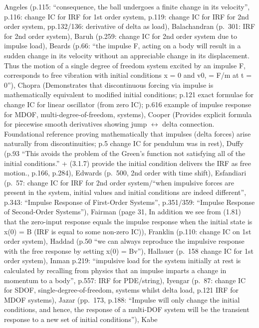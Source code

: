 \documentclass[
  11pt,
]{article}
\begin{document}
Angeles (p.115: ``consequence, the ball undergoes a finite change in its
velocity'', p.116: change IC for IRF for 1st order system, p.119: change
IC for IRF for 2nd order system, pp.132/136: derivative of delta as
load), Balachandran (p.~301: IRF for 2nd order system), Baruh (p.259:
change IC for 2nd order system due to impulse load), Beards (p.66: ``the
impulse F, acting on a body will result in a sudden change in its
velocity without an appreciable change in its displacement. Thus the
motion of a single degree of freedom system excited by an impulse F,
corresponds to free vibration with initial conditions x = 0 and v0, =
F/m at t = 0''), Chopra (Demonstrates that discontinuous forcing via
impulse is mathematically equivalent to modified initial conditions;
p.121 exact formulae for change IC for linear oscillator (from zero IC);
p.616 example of impulse response for MDOF, multi-degree-of-freedom,
systems), Cooper (Provides explicit formula for piecewise smooth
derivatives showing jump \(\leftrightarrow\) delta connection.
Foundational reference proving mathematically that impulses (delta
forces) arise naturally from discontinuities; p.5 change IC for pendulum
was in rest), Duffy (p.93 ``This avoids the problem of the Green's
function not satisfying all of the initial conditions.'' + (3.1.7)
provide the initial condition delivers the IRF as free motion., p.166,
p.284), Edwards (p.~500, 2nd order with time shift), Esfandiari (p.~57:
change IC for IRF for 2nd order system/``when impulsive forces are
present in the system, initial values and initial conditions are indeed
different'', p.343: ``Impulse Response of First-Order Systems'',
p.351/359: ``Impulse Response of Second-Order Systems''), Fairman (page
31, In addition we see from (1.81) that the zero-input response equals
the impulse response when the initial state is x(0) = B (IRF is equal to
some non-zero IC)), Franklin (p.110: change IC on 1st order system),
Haddad (p.50 ``we can always reproduce the impulsive response with the
free response by setting x(0) = Bv''), Hallauer (p.~158 change IC for
1st order system), Inman p.219: ``impulsive load for the system
initially at rest is calculated by recalling from physics that an
impulse imparts a change in momentum to a body'', p.557: IRF for
PDE/string), Iyengar (p.~87: change IC for SDOF,
single-degree-of-freedom, systems whilst delta load, p.121 IRF for MDOF
systems), Jazar (pp.~173, p.188: ``Impulse will only change the initial
conditions, and hence, the response of a multi-DOF system will be the
transient response to a new set of initial conditions''), Kabe
\end{document}
